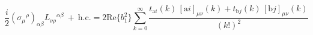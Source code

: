 \begin{equation}
\frac{i}2 (\sigma_{\mu}{}^{\rho})_{\alpha\beta}
L_{\nu\rho}{}^{\alpha\beta} \ + \ \mathrm{h.c.} 
 =
2 \mbox{Re}\{b_1^2\} \sum_{k=0}^\infty \frac{t_{\mathrm{a}i}(k) 
\, [\mbox{a$i$}]_{\mu\nu}{}(k) + t_{\mathrm{b}j}(k) 
\, [\mbox{b$j$}]_{\mu\nu}{}(k)}{(k!)^2}
\label{eq:L=2Reb^2}
\end{equation}

